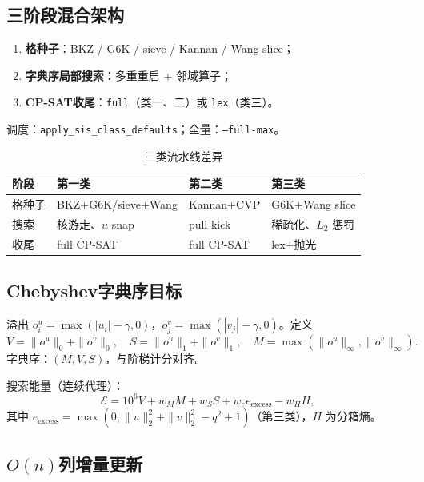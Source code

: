 \documentclass[12pt,a4paper]{ctexart}
\begin{document}
\subsection{三阶段混合架构}

\begin{enumerate}[leftmargin=2em]
  \item \textbf{格种子}：BKZ / G6K / sieve / Kannan / Wang slice；
  \item \textbf{字典序局部搜索}：多重重启 + 邻域算子；
  \item \textbf{CP-SAT收尾}：\texttt{full}（类一、二）或 \texttt{lex}（类三）。
\end{enumerate}

调度：\texttt{apply\_sis\_class\_defaults}；全量：\texttt{--full-max}。

\begin{table}[htbp]
  \centering
  \caption{三类流水线差异}
  \label{tab:pipeline}
  \small
  \begin{tabular}{p{1.4cm}p{3.8cm}p{3.8cm}p{3.6cm}}
    \toprule
    阶段 & 第一类 & 第二类 & 第三类 \\
    \midrule
    格种子 & BKZ+G6K/sieve+Wang & Kannan+CVP & G6K+Wang slice \\
    搜索 & 核游走、$u$ snap & pull kick & 稀疏化、$L_2$ 惩罚 \\
    收尾 & full CP-SAT & full CP-SAT & lex+抛光 \\
    \bottomrule
  \end{tabular}
\end{table}

\subsection{Chebyshev字典序目标}

溢出 $o^u_i=\max(|u_i|-\gamma,0)$，$o^v_j=\max(|v_j|-\gamma,0)$。定义
\begin{equation}\label{eq:lex}
  V=\|o^u\|_0+\|o^v\|_0,\quad
  S=\|o^u\|_1+\|o^v\|_1,\quad
  M=\max(\|o^u\|_{\infty},\|o^v\|_{\infty}).
\end{equation}
字典序：$(M,V,S)$，与阶梯计分对齐。

搜索能量（连续代理）：
\begin{equation}\label{eq:energy}
  \mathcal{E}=10^6 V + w_M M + w_S S + w_e e_{\mathrm{excess}} - w_H H,
\end{equation}
其中 $e_{\mathrm{excess}}=\max(0,\|u\|_2^2+\|v\|_2^2-q^2{+}1)$（第三类），$H$ 为分箱熵。

\subsection{$O(n)$列增量更新}
\end{document}
